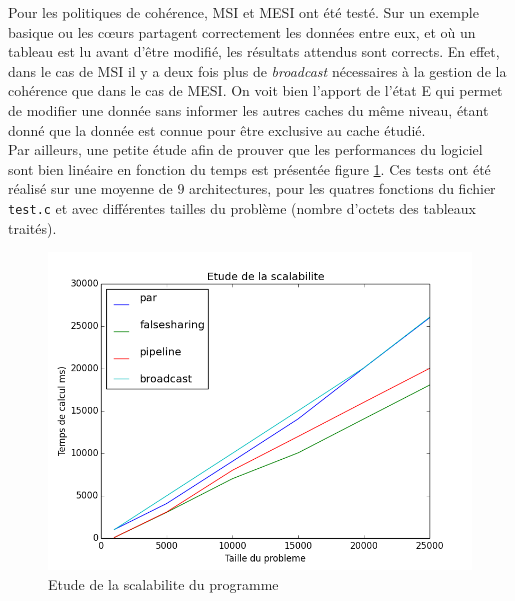 Pour les politiques de cohérence, MSI et MESI ont été testé. Sur un exemple basique ou les c{\oe}urs partagent correctement les données entre eux, et où un tableau est lu avant d'être modifié, les résultats attendus sont corrects. En effet, dans le cas de MSI il y a deux fois plus de \emph{broadcast} nécessaires à la gestion de la cohérence que dans le cas de MESI. On voit bien l'apport de l'état E qui permet de modifier une donnée sans informer les autres caches du même niveau, étant donné que la donnée est connue pour être exclusive au cache étudié. \\

Par ailleurs, une petite étude afin de prouver que les performances du logiciel sont bien linéaire en fonction du temps est présentée figure \ref{img:inclusifs}. Ces tests ont été réalisé sur une moyenne de $9$ architectures, pour les quatres fonctions du fichier \texttt{test.c} et avec différentes tailles du problème (nombre d'octets des tableaux traités).\\

\begin{figure}[H]
\begin{center}
   \includegraphics[scale=0.5]{images/scalability.png}
   \caption{\label{img:inclusifs} Etude de la scalabilite du programme}
\end{center}
\end{figure}
